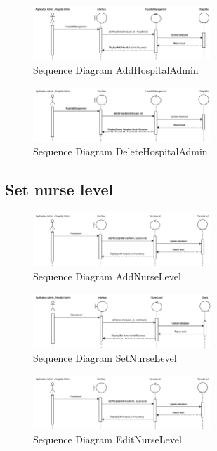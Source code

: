     \begin{figure}[h]
    \centering
    \includegraphics[width=0.6\textwidth]{Sequence 9.4.png}
    \caption{Sequence Diagram AddHospitalAdmin}
    \end{figure}

    \begin{figure}[h]
    \centering
    \includegraphics[width=0.6\textwidth]{Sequence 9.5.png}
    \caption{Sequence Diagram DeleteHospitalAdmin}
    \end{figure}

\subsection{Set nurse level}

\begin{figure}[h]
    \centering
    \includegraphics[width=0.6\textwidth]{Sequence 10.1.png}
    \caption{Sequence Diagram AddNurseLevel}
    \end{figure}

    \begin{figure}[h]
    \centering
    \includegraphics[width=0.6\textwidth]{Sequence 10.2.png}
    \caption{Sequence Diagram SetNurseLevel}
    \end{figure}

    \begin{figure}[h]
    \centering
    \includegraphics[width=0.6\textwidth]{Sequence 10.3.png}
    \caption{Sequence Diagram EditNurseLevel}
    \end{figure}

